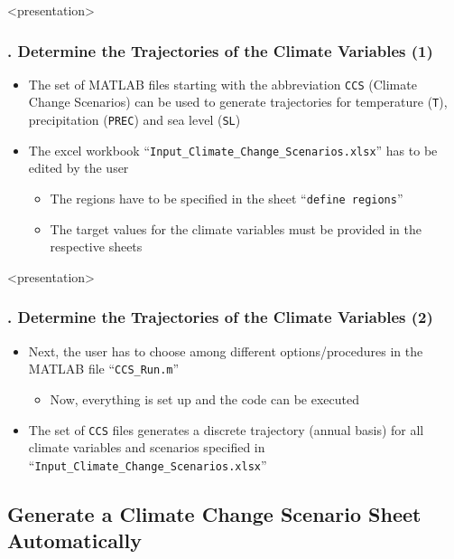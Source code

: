\documentclass[11pt,aspectratio=169]{beamer}
\begin{document}
\begin{frame}<presentation>
	\frametitle{{\thesection.\thesubsection} Determine the Trajectories of the Climate Variables (1)}
	\begin{itemize}
		\item The set of MATLAB files starting with the abbreviation \texttt{CCS} (Climate Change Scenarios) can be used to generate trajectories for temperature (\texttt{T}), precipitation (\texttt{PREC}) and sea level (\texttt{SL}) 
		\item The excel workbook ``\texttt{Input\_Climate\_Change\_Scenarios.xlsx}'' has to be edited by the user
		\begin{itemize}
			\item The regions have to be specified in the sheet ``\texttt{define regions}''
			\item The target values for the climate variables must be provided in the respective sheets
		\end{itemize}
	\end{itemize}
\end{frame}
\begin{frame}<presentation>
	\frametitle{{\thesection.\thesubsection} Determine the Trajectories of the Climate Variables (2)}
	\begin{itemize}
		\item Next, the user has to choose among different options/procedures in the MATLAB file ``\texttt{CCS\_Run.m}'' 
		\begin{itemize}
			\item Now, everything is set up and the code can be executed
		\end{itemize}
		\item The set of \texttt{CCS} files generates a discrete trajectory (annual basis) for all climate variables and scenarios specified in ``\texttt{Input\_Climate\_Change\_Scenarios.xlsx}''
	\end{itemize}
\end{frame}

\subsection{Generate a Climate Change Scenario Sheet Automatically}
\end{document}
